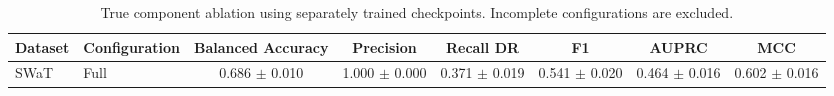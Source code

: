 \begin{table}[t]
\centering
\caption{True component ablation using separately trained checkpoints. Incomplete configurations are excluded.}
\label{tab:true_ablation}
\renewcommand{\arraystretch}{1.12}
\setlength{\tabcolsep}{4pt}
\begin{tabular}{llcccccc}
\hline
Dataset & Configuration & Balanced Accuracy & Precision & Recall DR & F1 & AUPRC & MCC \\
\hline
SWaT & Full & 0.686 $\pm$ 0.010 & 1.000 $\pm$ 0.000 & 0.371 $\pm$ 0.019 & 0.541 $\pm$ 0.020 & 0.464 $\pm$ 0.016 & 0.602 $\pm$ 0.016 \\
\hline
\end{tabular}
\end{table}